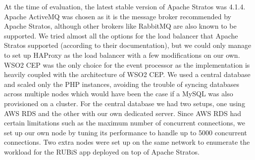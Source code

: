 At the time of evaluation, the latest stable version of Apache Stratos was 4.1.4. Apache ActiveMQ was chosen as it is the message broker recommended by Apache Stratos, although other brokers like RabbitMQ are also known to be supported. We tried almost all the options for the load balancer that Apache Stratos supported (according to their documentation), but we could only manage to set up HAProxy as the load balancer with a few modifications on our own. WSO2 CEP was the only choice for the event processor as the implementation is heavily coupled with the architecture of WSO2 CEP. We used a central database and scaled only the PHP instances, avoiding the trouble of syncing databases across multiple nodes which would have been the case if a MySQL was also provisioned on a cluster. For the central database we had two setups, one using AWS RDS and the other with our own dedicated server. Since AWS RDS had certain limitations such as the maximum number of concurrent connections, we set up our own node by tuning its performance to handle up to 5000 concurrent connections. Two extra nodes were set up on the same network to enumerate the workload for the RUBiS app deployed on top of Apache Stratos.